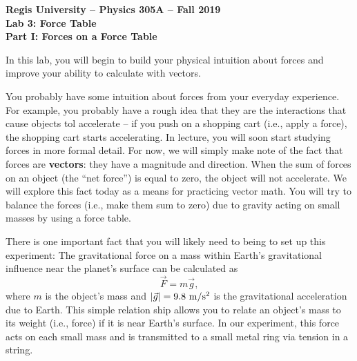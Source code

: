 \documentclass[11pt]{article}
\begin{document}
\begin{center}
{\bf{Regis University -- Physics 305A -- Fall 2019}} \\
{\bf{Lab 3: Force Table}} \\
\medskip
\textbf{Part I: Forces on a Force Table}
\end{center}

\medskip

In this lab, you will begin to build your physical intuition about forces and 
improve your ability to calculate with vectors.

You probably have some intuition about forces from your everyday experience. For example, you probably have a rough idea that they are the interactions that cause objects tol accelerate -- if you push on a shopping cart (i.e., apply a force), the shopping cart starts accelerating. In lecture, you will soon start studying forces in more formal detail. For now, we will simply make note of the fact that forces are \textbf{vectors}: they have a magnitude and direction. When the sum of forces on an object (the ``net force'') is equal to zero, the object will not accelerate. We will explore this fact today as a means for practicing vector math. You will try to balance the forces (i.e., make them sum to zero) due to gravity acting on small masses by using a force table.

There is one important fact that you will likely need to being to set up this experiment: The gravitational force on a mass within Earth's gravitational influence near the planet's surface can be calculated as 
\begin{equation}
\vec{F}=m\vec{g},
\end{equation}
where $m$ is the object's mass and $|\vec{g}|=9.8~\rm m/s^2$ is the gravitational acceleration due to Earth. This simple relation ship allows you to relate an object's mass to its weight (i.e., force) if it is near Earth's surface. In our experiment, this force acts on each small mass and is transmitted to a small metal ring via tension in a string.

\bigskip
\end{document}

